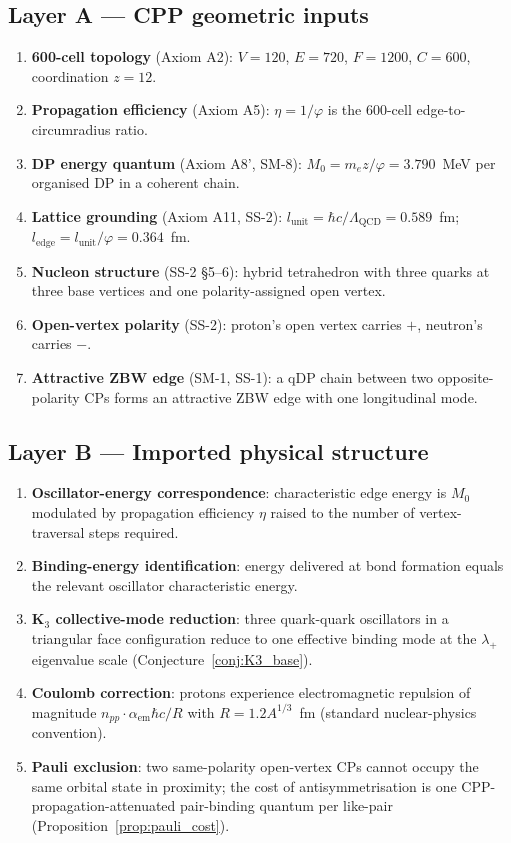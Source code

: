 \documentclass[11pt,letterpaper]{article}
\newcommand{\phig}{\varphi}
\newcommand{\Mzero}{M_0}
\newcommand{\lunit}{l_{\mathrm{unit}}}
\newcommand{\ledge}{l_{\mathrm{edge}}}
\newcommand{\LQCD}{\Lambda_{\mathrm{QCD}}}
\newcommand{\npp}{n_{pp}}
\begin{document}
\subsection{Layer A --- CPP geometric inputs}
\label{sec:layerA}

\begin{enumerate}[label=(A\arabic*)]
\item \textbf{600-cell topology} (Axiom A2): $V=120$, $E=720$, $F=1200$, $C=600$, coordination $z=12$.
\item \textbf{Propagation efficiency} (Axiom A5): $\eta = 1/\phig$ is the 600-cell edge-to-circumradius ratio.
\item \textbf{DP energy quantum} (Axiom A8', SM-8): $\Mzero = m_e z/\phig = 3.790$~MeV per organised DP in a coherent chain.
\item \textbf{Lattice grounding} (Axiom A11, SS-2): $\lunit = \hbar c/\LQCD = 0.589$~fm; $\ledge = \lunit/\phig = 0.364$~fm.
\item \textbf{Nucleon structure} (SS-2 \S5--6): hybrid tetrahedron with three quarks at three base vertices and one polarity-assigned open vertex.
\item \textbf{Open-vertex polarity} (SS-2): proton's open vertex carries $+$, neutron's carries $-$.
\item \textbf{Attractive ZBW edge} (SM-1, SS-1): a qDP chain between two opposite-polarity CPs forms an attractive ZBW edge with one longitudinal mode.
\end{enumerate}

\subsection{Layer B --- Imported physical structure}
\label{sec:layerB}

\begin{enumerate}[label=(B\arabic*)]
\item \textbf{Oscillator-energy correspondence}: characteristic edge energy is $\Mzero$ modulated by propagation efficiency $\eta$ raised to the number of vertex-traversal steps required.
\item \textbf{Binding-energy identification}: energy delivered at bond formation equals the relevant oscillator characteristic energy.
\item \textbf{K$_3$ collective-mode reduction}: three quark-quark oscillators in a triangular face configuration reduce to one effective binding mode at the $\lambda_+$ eigenvalue scale (Conjecture~\ref{conj:K3_base}).
\item \textbf{Coulomb correction}: protons experience electromagnetic repulsion of magnitude $\npp \cdot \alpha_{\mathrm{em}} \hbar c / R$ with $R = 1.2 A^{1/3}$~fm (standard nuclear-physics convention).
\item \textbf{Pauli exclusion}: two same-polarity open-vertex CPs cannot occupy the same orbital state in proximity; the cost of antisymmetrisation is one CPP-propagation-attenuated pair-binding quantum per like-pair (Proposition~\ref{prop:pauli_cost}).
\end{enumerate}
\end{document}
